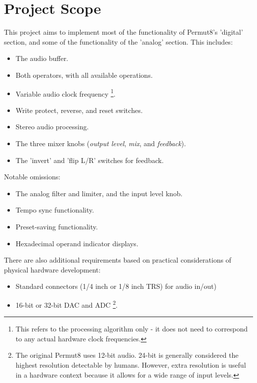 \documentclass[12pt, letterpaper]{article}
\begin{document}
\section{Project Scope}
This project aims to implement most of the functionality of Permut8's 'digital' section, and some of the functionality of the 'analog' section. This includes:
\begin{itemize}
  \item The audio buffer.
  \item Both operators, with all available operations.
  \item Variable audio clock frequency \footnote{This refers to the processing algorithm only - it does not need to correspond to any actual hardware clock frequencies.}.
  \item Write protect, reverse, and reset switches.
  \item Stereo audio processing.
  \item The three mixer knobs (\textit{output level}, \textit{mix}, and \textit{feedback}).
  \item The 'invert' and 'flip L/R' switches for feedback.
\end{itemize}
Notable omissions:
\begin{itemize}
  \item The analog filter and limiter, and the input level knob.
  \item Tempo sync functionality.
  \item Preset-saving functionality.
  \item Hexadecimal operand indicator displays.
\end{itemize}
There are also additional requirements based on practical considerations of physical hardware development:
\begin{itemize}
  \item Standard connectors (1/4 inch or 1/8 inch TRS) for audio in/out)
  \item 16-bit or 32-bit DAC and ADC \footnote{The original Permut8 uses 12-bit audio. 24-bit is generally considered the highest resolution detectable by humans. However, extra resolution is useful in a hardware context because it allows for a wide range of input levels.}.
\end{itemize}
\end{document}
